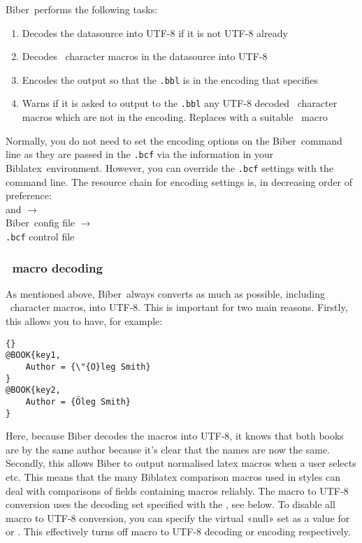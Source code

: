 \documentclass{ltxdockit}
\newcommand*{\biber}{Biber\xspace}
\newcommand*{\biblatex}{Biblatex\xspace}
\begin{document}
\noindent \biber\ performs the following tasks:

\begin{enumerate}
\item Decodes the datasource into UTF-8 if it is not UTF-8 already
\item Decodes \latex\ character macros in the datasource into UTF-8
\item Encodes the output so that the \verb+.bbl+ is in
  the encoding that  specifies
\item Warns if it is asked to output to the \verb+.bbl+ any UTF-8
  decoded \latex\ character macros which are not in the
   encoding. Replaces with a suitable \latex\ macro
\end{enumerate}

\noindent Normally, you do not need to set the encoding options on the
\biber\ command line as they are passed in the \verb+.bcf+ via the
information in your \biblatex\ environment. However, you can override
the \verb+.bcf+ settings with the command line. The resource chain for
encoding settings is, in decreasing order
of preference:\\[2ex]

\noindent{} and  $\rightarrow$\\
\hspace*{1em}\biber\ config file $\rightarrow$\\
\hspace*{2em}\verb+.bcf+ control file

\subsubsection{\latex\ macro decoding}\label{ldecode}

\noindent As mentioned above, \biber\ always converts as much as possible,
including \latex\ character macros, into UTF-8. This is important for two
main reasons. Firstly, this allows you to have, for example:

\begin{lstlisting}[style=bibtex, columns=fixed]{}
@BOOK{key1,
    Author = {\"{O}leg Smith}
}
@BOOK{key2,
    Author = {Öleg Smith}
}
\end{lstlisting}
%
Here, because \biber decodes the macros into UTF-8, it knows that both
books are by the same author because it's clear that the names are now the
same. Secondly, this allows \biber to output normalised latex macros when a
user selects  etc. This means that the many
\biblatex comparison macros used in styles can deal with comparisons of
fields containing macros reliably. The macro to UTF-8 conversion uses the
decoding set specified with the , see below. To
disable all macro to UTF-8 conversion, you can specify the virtual «null»
set as a value for  or .
This effectively turns off macro to UTF-8 decoding or encoding respectively.
\end{document}
